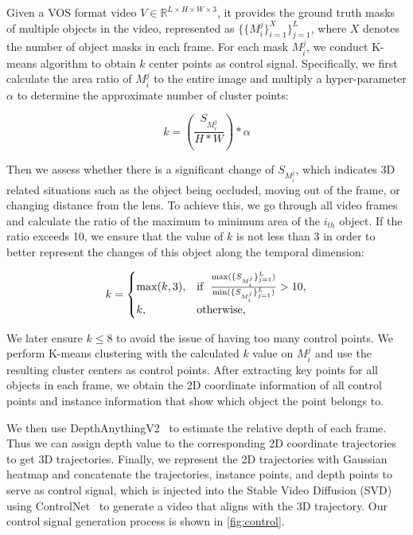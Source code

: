 Given a VOS format video $V \in \mathbb{R}^{L \times H \times W \times 3}$, it provides the ground truth masks of multiple objects in the video, represented as $\{\{M_i^j\}_{i=1}^X\}_{j=1}^L$, where $X$ denotes the number of object masks in each frame. For each mask $M_i^j$, we conduct K-means algorithm to obtain $k$ center points as control signal. Specifically, we first calculate the area ratio of $M_i^j$ to the entire image and multiply a hyper-parameter $\alpha$ to determine the approximate number of cluster points:

\vspace{-5pt}
\begin{equation}
k = (\frac{S_{M_i^j}}{H*W}) * \alpha
\end{equation}

Then we assess whether there is a significant change of $S_{M_i^j}$, which indicates 3D related situations such as the object being occluded, moving out of the frame, or changing distance from the lens. To achieve this, we go through all video frames and calculate the ratio of the maximum to minimum area of the $i_{th}$ object. If the ratio exceeds 10, we ensure that the value of $k$ is not less than 3 in order to better represent the changes of this object along the temporal dimension:

\vspace{-10pt}
\begin{equation}
k = 
\begin{cases}
{\rm max}(k, 3), & {\rm if} \;\; \frac{{\rm max}(\{S_{M_i^j}\}_{j=1}^L)}{{\rm min}(\{S_{M_i^j}\}_{j=1}^L)} > 10, \\
k, & {\rm otherwise},
\end{cases}
\end{equation}

We later ensure $k \le 8$ to avoid the issue of having too many control points. We perform K-means clustering with the calculated $k$ value on $M_i^j$ and use the resulting cluster centers as control points. After extracting key points for all objects in each frame, we obtain the 2D coordinate information of all control points and instance information that show which object the point belongs to.

We then use DepthAnythingV2~\cite{depth_anything_v2} to estimate the relative depth of each frame. Thus we can assign depth value to the corresponding 2D coordinate trajectories to get 3D trajectories. Finally, we represent the 2D trajectories with Gaussian heatmap and concatenate the trajectories, instance points, and depth points to serve as control signal, which is injected into the Stable Video Diffusion (SVD)~\cite{SVD} using ControlNet~\cite{controlnet} to generate a video that aligns with the 3D trajectory. Our control signal generation process is shown in \cref{fig:control}.

